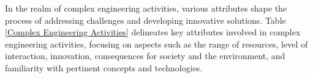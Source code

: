 





In the realm of complex engineering activities, various attributes shape the process of addressing challenges and developing innovative solutions. Table \ref{Complex Engineering Activities} delineates key attributes involved in complex engineering activities, focusing on aspects such as the range of resources, level of interaction, innovation, consequences for society and the environment, and familiarity with pertinent concepts and technologies.

